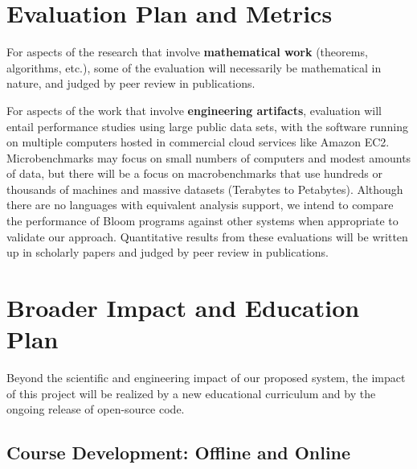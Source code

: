 \section{Evaluation Plan and Metrics}

For aspects of the research that involve \textbf{mathematical work} (theorems, algorithms, etc.), some of the evaluation will necessarily be mathematical in nature, and judged by peer review in publications.

For aspects of the work that involve \textbf{engineering artifacts}, evaluation will entail performance studies using large public data sets, with the software running on multiple computers hosted in commercial cloud services like Amazon EC2.  Microbenchmarks may focus on small numbers of computers and modest amounts of data, but there will be a focus on macrobenchmarks that use hundreds or thousands of machines and massive datasets (Terabytes to Petabytes).  Although there are no languages with equivalent analysis support, we intend to compare the performance of Bloom programs against other systems when appropriate to validate our approach. Quantitative results from these evaluations will be written up in scholarly papers and judged by peer review in publications.

\section{Broader Impact and Education Plan}

Beyond the scientific and engineering impact of our proposed system,
the impact of this project will be realized by a new educational
curriculum and by the ongoing release of open-source code.  


\subsection{Course Development: Offline and Online}


